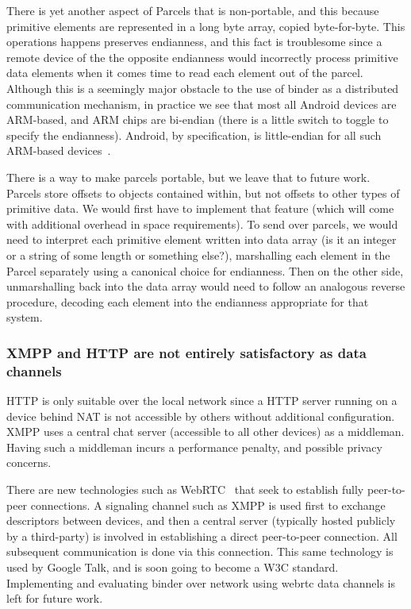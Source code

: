 \documentclass[prodmode]{acmlarge}
\begin{document}
There is yet another aspect of Parcels that is non-portable, and this because primitive elements are represented in a long byte array, copied byte-for-byte. This operations happens preserves endianness, and this fact is troublesome since a remote device of the the opposite endianness would incorrectly process primitive data elements when it comes time to read each element out of the parcel. Although this is a seemingly major obstacle to the use of binder as a distributed communication mechanism, in practice we see that most all Android devices are ARM-based, and ARM chips are bi-endian (there is a little switch to toggle to specify the endianness). Android, by specification, is little-endian for all such ARM-based devices~\cite{ARMLittleEndian}.

There is a way to make parcels portable, but we leave that to future work. Parcels store offsets to objects contained within, but not offsets to other types of primitive data. We would first have to implement that feature (which will come with additional overhead in space requirements). To send over parcels, we would need to interpret each primitive element written into data array (is it an integer or a string of some length or something else?), marshalling each element in the Parcel separately using a canonical choice for endianness. Then on the other side, unmarshalling back into the data array would need to follow an analogous reverse procedure, decoding each element into the endianness appropriate for that system.

\subsubsection{XMPP and HTTP are not entirely satisfactory as data channels}
HTTP is only suitable over the local network since a HTTP server running on a device behind NAT is not accessible by others without additional configuration. XMPP uses a central chat server (accessible to all other devices) as a middleman. Having such a middleman incurs a performance penalty, and possible privacy concerns.

There are new technologies such as WebRTC~\cite{GoogleTalkLibrary} that seek to establish fully peer-to-peer connections. A signaling channel such as XMPP is used first to exchange descriptors between devices, and then a central server (typically hosted publicly by a third-party) is involved in establishing a direct peer-to-peer connection. All subsequent communication is done via this connection. This same technology is used by Google Talk, and is soon going to become a W3C standard. Implementing and evaluating binder over network using webrtc data channels is left for future work.
\end{document}

